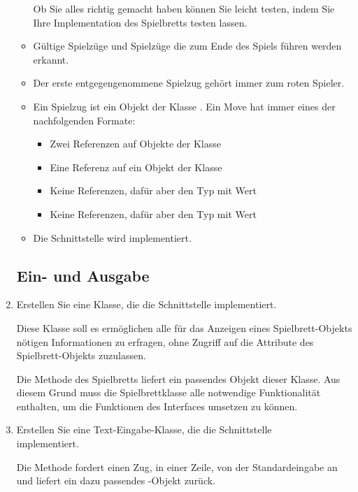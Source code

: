 \begin{enumerate}
\begin{itemize}
Ob Sie alles richtig gemacht haben können Sie leicht testen, indem Sie Ihre Implementation des Spielbretts testen lassen.
\item Gültige Spielzüge und Spielzüge die zum Ende des Spiels führen werden erkannt.
\item Der erste entgegengenommene Spielzug gehört immer zum roten Spieler.
\item Ein Spielzug ist ein Objekt der Klasse . Ein Move hat immer eines der nachfolgenden Formate:
\begin{itemize}
\item Zwei Referenzen auf Objekte der Klasse 
\item Eine Referenz auf ein Objekt der Klasse 
\item Keine Referenzen, dafür aber den Typ  mit Wert 
\item Keine Referenzen, dafür aber den Typ  mit Wert 
\end{itemize}
\item Die Schnittstelle  wird implementiert. 
\end{itemize}

\subsection*{Ein- und Ausgabe}
\item Erstellen Sie eine Klasse, die die Schnittstelle  implementiert.

Diese Klasse soll es ermöglichen alle für das Anzeigen eines Spielbrett-Objekts nötigen Informationen zu erfragen, ohne Zugriff auf die Attribute des Spielbrett-Objekts zuzulassen.

Die Methode  des Spielbretts liefert ein passendes Objekt dieser Klasse. Aus diesem Grund muss die Spielbrettklasse alle notwendige Funktionalität enthalten, um die Funktionen des  Interfaces umsetzen zu können.

\item Erstellen Sie eine Text-Eingabe-Klasse, die die Schnittstelle \\  implementiert.

Die Methode  fordert einen Zug, in einer Zeile, von der Standardeingabe an und liefert ein dazu passendes -Objekt zurück.


\end{enumerate}
